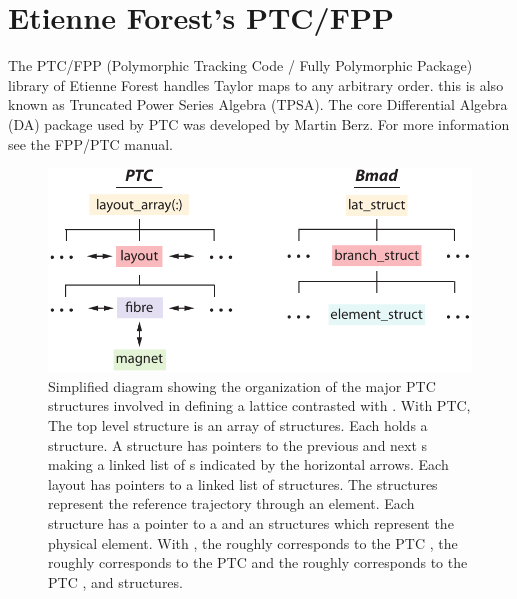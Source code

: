 \chapter{Etienne Forest's PTC/FPP}
\label{c:ptc}

The PTC/FPP (Polymorphic Tracking Code / Fully Polymorphic Package)
library of Etienne Forest handles Taylor maps to any arbitrary
order. this is also known as Truncated Power Series Algebra
(TPSA). The core Differential Algebra (DA) package used by PTC was
developed by Martin Berz\cite{b:berz}.  For more information see the
FPP/PTC manual\cite{b:ptc}. 


\begin{figure}
  \centering
  \includegraphics{ptc-structures.pdf}
  \caption[PTC structure relationships] { 
Simplified diagram showing the organization of the major PTC
structures involved in defining a lattice contrasted with \bmad. With
PTC, The top level structure is an array of 
structures. Each  holds a  structure. A
 structure has pointers to the previous and next
s making a linked list of s indicated by the
horizontal arrows. Each layout has pointers to a linked list of
 structures. The  structures represent the
reference trajectory through an element. Each  structure has
a pointer to a  and an  structures which
represent the physical element. With \bmad, the 
roughly corresponds to the PTC , the
 roughly corresponds to the PTC  and the
 roughly corresponds to the PTC ,
 and  structures.
  }
\label{f:ptc-struct}
\end{figure}

